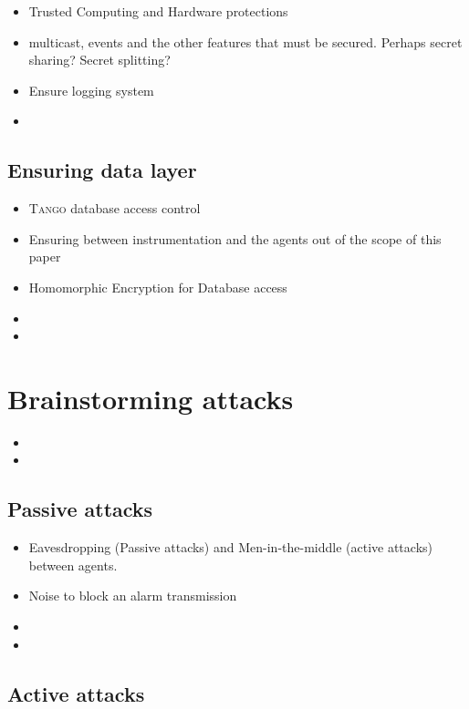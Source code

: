 \documentclass[10pt,a4paper,twoside]{llncs}
\newcommand{\tango}{\textsc{Tango} }
\begin{document}
\begin{itemize}
 \item Trusted Computing and Hardware protections
 \item multicast, events and the other features that must be secured. Perhaps secret sharing? Secret splitting?
 \item Ensure logging system
 \item 
\end{itemize}

%
\subsection{Ensuring data layer}

\begin{itemize}
 \item \tango database access control
 \item Ensuring between instrumentation and the agents out of the scope of this paper
 \item Homomorphic Encryption for Database access
 \item  
 \item 
\end{itemize}

%
\section{Brainstorming attacks}

\begin{itemize}
 \item
 \item 
\end{itemize}

%
\subsection{Passive attacks}

\begin{itemize}
 \item Eavesdropping (Passive attacks) and Men-in-the-middle (active attacks) between agents.
 \item Noise to block an alarm transmission
 \item 
 \item 
\end{itemize}

%
\subsection{Active attacks}
\end{document}
